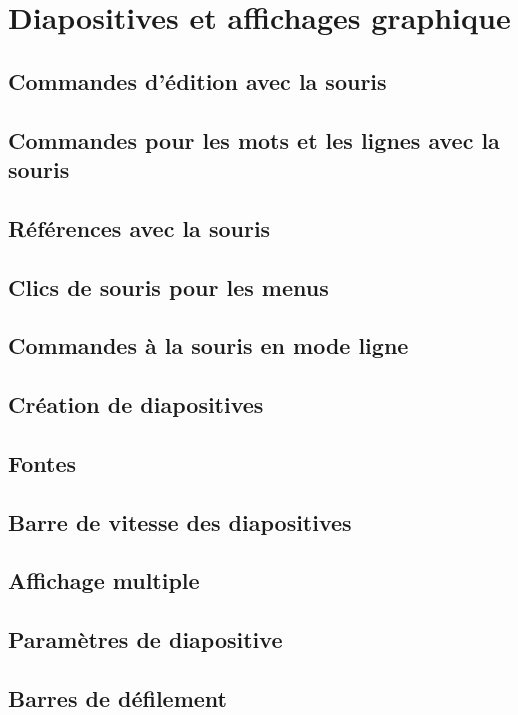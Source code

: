 \chapter{Diapositives et affichages graphique}\label{chap18}
\section{Commandes d'édition avec la souris}\label{chap18sec1}
\section{Commandes pour les mots et les lignes avec la
  souris}\label{chap18sec2} 
\section{Références avec la souris}\label{chap18sec3}
\section{Clics de souris pour les menus}\label{chap18sec4}
\section{Commandes à la souris en mode ligne}\label{chap18sec5}
\section{Création de diapositives}\label{chap18sec6}
\section{Fontes}\label{chap18sec7}
\section{Barre de vitesse des diapositives}\label{chap18sec8}
\section{Affichage multiple}\label{chap18sec9}
\section{Paramètres de diapositive}\label{chap18sec10}
\section{Barres de défilement}\label{chap18sec11}
